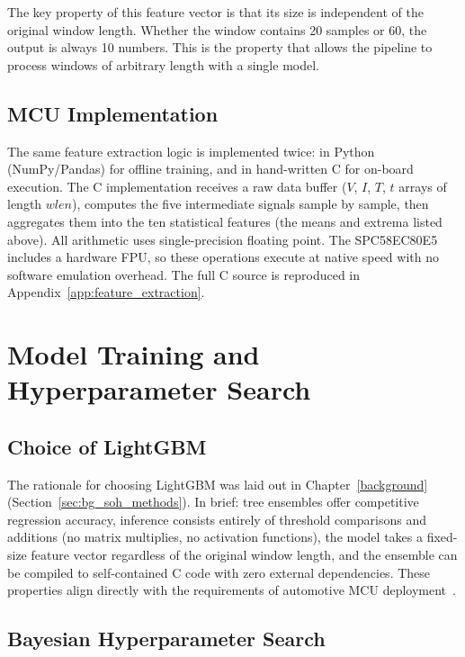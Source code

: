 The key property of this feature vector is that its size is independent of the original window length. Whether the window contains 20 samples or 60, the output is always 10 numbers. This is the property that allows the pipeline to process windows of arbitrary length with a single model.

\subsection{MCU Implementation}

The same feature extraction logic is implemented twice: in Python (NumPy/Pandas) for offline training, and in hand-written C for on-board execution. The C implementation receives a raw data buffer ($V$, $I$, $T$, $t$ arrays of length $wlen$), computes the five intermediate signals sample by sample, then aggregates them into the ten statistical features (the means and extrema listed above). All arithmetic uses single-precision floating point. The SPC58EC80E5 includes a hardware FPU, so these operations execute at native speed with no software emulation overhead. The full C source is reproduced in Appendix~\ref{app:feature_extraction}.


\section{Model Training and Hyperparameter Search}
\label{sec:ch3_training}

\subsection{Choice of LightGBM}

The rationale for choosing LightGBM was laid out in Chapter~\ref{background} (Section~\ref{sec:bg_soh_methods}). In brief: tree ensembles offer competitive regression accuracy, inference consists entirely of threshold comparisons and additions (no matrix multiplies, no activation functions), the model takes a fixed-size feature vector regardless of the original window length, and the ensemble can be compiled to self-contained C code with zero external dependencies. These properties align directly with the requirements of automotive MCU deployment~\autocite{ke2017}.

\subsection{Bayesian Hyperparameter Search}

